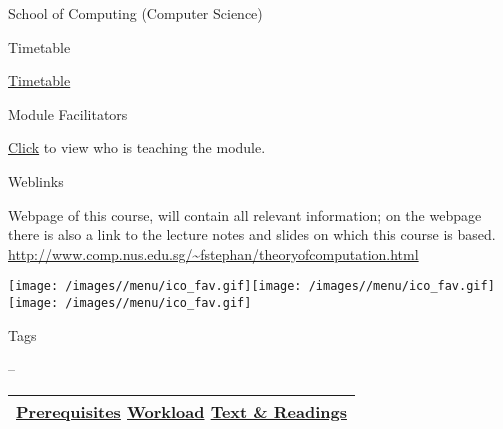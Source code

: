 \protect\hypertarget{ctl00_ctl00_ContentPlaceHolder1_ContentPlaceHolder1_LV_ctrl0_lcFac}{}{School
of Computing (Computer Science)}

\protect\hypertarget{ctl00_ctl00_ContentPlaceHolder1_ContentPlaceHolder1_LV_ctrl0_Label1}{}{Timetable}

\protect\hypertarget{ctl00_ctl00_ContentPlaceHolder1_ContentPlaceHolder1_LV_ctrl0_Span1}{}{\href{javascript:void(0);}{Timetable}}

\protect\hypertarget{ctl00_ctl00_ContentPlaceHolder1_ContentPlaceHolder1_LV_ctrl0_Label6}{}{Module
Facilitators}

\protect\hypertarget{ctl00_ctl00_ContentPlaceHolder1_ContentPlaceHolder1_LV_ctrl0_Span2}{}{\href{list_lecturers.aspx?CourseID=edb541d2-645a-4d61-8d78-2354d9a1ea1e\&ClickFrom=}{Click}
to view who is teaching the module.}

\protect\hypertarget{ctl00_ctl00_ContentPlaceHolder1_ContentPlaceHolder1_LV_ctrl0_LabelCtrl1}{}{Weblinks}

{ }

\protect\hypertarget{ctl00_ctl00_ContentPlaceHolder1_ContentPlaceHolder1_LV_ctrl0_LV_Weblink_ctrl0_lblDesc}{}{Webpage
of this course, will contain all relevant information; on the webpage
there is also a link to the lecture notes and slides on which this
course is based.}
\href{javascript:__doPostBack('ctl00$ctl00$ContentPlaceHolder1$ContentPlaceHolder1$LV$ctrl0$LV_Weblink$ctrl0$lbView','')}{\\
http://www.comp.nus.edu.sg/\textasciitilde{}fstephan/theoryofcomputation.html}

\protect\hypertarget{ctl00_ctl00_ContentPlaceHolder1_ContentPlaceHolder1_LV_ctrl0_LV_Weblink_ctrl0_lcWebRatings}{}{\texttt{[image: /images//menu/ico\_fav.gif]}\texttt{[image: /images//menu/ico\_fav.gif]}\texttt{[image: /images//menu/ico\_fav.gif]}}

\protect\hypertarget{ctl00_ctl00_ContentPlaceHolder1_ContentPlaceHolder1_LV_ctrl0_Label4}{}{Tags}

\protect\hypertarget{ctl00_ctl00_ContentPlaceHolder1_ContentPlaceHolder1_LV_ctrl0_lblTags}{}{--}

\begin{longtable}[]{@{}l@{}}
\toprule
\protect\hypertarget{ctl00_ctl00_ContentPlaceHolder1_ContentPlaceHolder1_lblSectionMiddle}{}{\protect\hyperlink{Prerequisites}{Prerequisites}
\textbar{} \protect\hyperlink{Workload}{Workload} \textbar{}
\protect\hyperlink{References}{Text \& Readings}}\tabularnewline
\bottomrule
\end{longtable}

